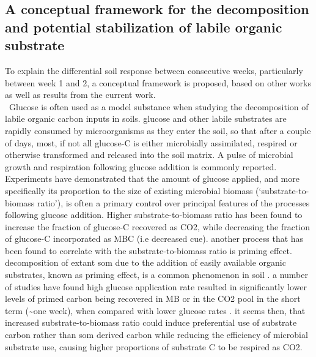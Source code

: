 	\subsection{A conceptual framework for the decomposition and potential stabilization of labile organic substrate}
	To explain the differential soil response between consecutive weeks, particularly between week 1 and 2, a conceptual framework is proposed, based on other works as well as results from the current work.\\ \
		Glucose is often used as a model substance when studying the decomposition of labile organic carbon inputs in soils\citep{kuzyakov2010}. glucose and other labile substrates are rapidly consumed by microorganisms as they enter the soil, so that after a couple of days, most, if not all glucose-C is either microbially assimilated, respired or otherwise transformed and released into the soil matrix\citep{fischer2010}. A pulse of microbial growth and respiration following glucose addition is commonly reported.
	Experiments have demonstrated that the amount of glucose applied, and more specifically its proportion to the size of existing microbial biomass (‘substrate-to-biomass ratio’), is often a primary control over principal features of the processes following  glucose addition. Higher substrate-to-biomass ratio has been found to increase the fraction of glucose-C recovered as CO2, while decreasing the fraction of glucose-C incorporated as MBC (i.e decreased \gls{cue})\citep{schneckenberger2008, tian2015}.
	another process that has been found to correlate with the substrate-to-biomass ratio is priming effect. decomposition of extant \gls{som} due to the addition of easily available organic substrates, known as priming effect, is a common phenomenon in soil \citep{kuzyakov2010}. a number of studies have found  high glucose application rate resulted in significantly lower levels of primed carbon being recovered in MB or in the  CO2 pool in the short term (\~{}one week), when compared with lower glucose rates \citep{blagodatskaya2011, schneckenberger2008, wu1993}.
	it seems then, that increased substrate-to-biomass ratio could induce preferential use of substrate carbon rather than \gls{som} derived carbon while reducing the efficiency of microbial substrate use, causing higher proportions of substrate C to be respired as CO2.
